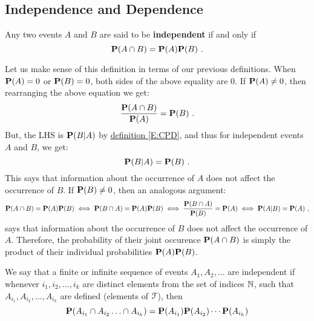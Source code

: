  \subsection{Independence and Dependence}\label{S:IndepDep}
 \begin{definition}\label{D:IndOf2Events}
 Any two events $A$ and $B$ are said to be {\bf independent} if and only if
 \begin{equation}\label{E:PofAB=PAPB}
 \mathbf{P}(A \cap B) = \mathbf{P}(A) \mathbf{P}(B) \ .
 \end{equation}
 \end{definition}
 Let us make sense of this definition in terms of our previous definitions.  When $\mathbf{P}(A)=0$ or $\mathbf{P}(B)=0$, both sides of the above equality are $0$.  If $\mathbf{P}(A) \neq 0$, then rearranging the above equation we get:
 \[
 \frac{\mathbf{P}(A \cap B)}{\mathbf{P}(A)} = \mathbf{P}(B) \ .
 \]
 But, the LHS is $\mathbf{P}(B|A)$ by \hyperref[E:CPD]{definition \ref*{E:CPD}}, and thus for independent events $A$ and $B$, we get:
 \[
 \mathbf{P}(B|A) = \mathbf{P}(B) \ .
 \]
This says that information about the occurrence of $A$ does not affect the occurrence of $B$.  If $\mathbf{P}(B) \neq 0$, then an analogous argument:
{\scriptsize
\[
\mathbf{P}(A \cap B) = \mathbf{P}(A) \mathbf{P}(B) \iff \mathbf{P}(B \cap A) = \mathbf{P}(A) \mathbf{P}(B) \iff \frac{\mathbf{P}(B \cap A)}{\mathbf{P}(B)} = \mathbf{P}(A) \iff  \mathbf{P}(A|B) = \mathbf{P}(A) \ ,
\]
}
says that information about the occurrence of $B$ does not affect the occurrence of $A$.  Therefore, the probability of their joint occurence $\mathbf{P}(A \cap B)$ is simply the product of their individual probabilities $\mathbf{P}(A) \mathbf{P}(B)$.

\begin{definition}\label{D:IndOfSeqOfEvents}
We say that a finite or infinite sequence of events $A_1,A_2,\ldots$ are independent if whenever $i_1,i_2,\ldots,i_k$ are distinct elements from the set of indices $\mathbb{N}$, such that $A_{i_1},A_{i_2},\ldots,A_{i_k}$ are defined (elements of $\mathcal{F}$), then
\[
\mathbf{P}(A_{i_1} \cap A_{i_2} \ldots \cap A_{i_k})  =  \mathbf{P}(A_{i_1} ) \mathbf{P}(A_{i_2})  \cdots \mathbf{P}(A_{i_k}) 
\]
\end{definition}

